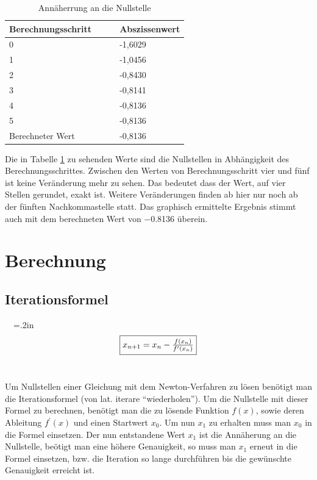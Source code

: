 \documentclass[a4paper,12pt,fleqn,oneside]{article}
\begin{document}
\FloatBarrier
		\begin{table}[]
			\centering
			\begin{tabular}{@{}ll@{}}
				\toprule
				Berechnungsschritt\ \ \ \ 		& Abszissenwert \\ \midrule
				0                  				& -1,6029       \\
				1                  				& -1,0456       \\
				2                  				& -0,8430       \\
				3                  				& -0,8141       \\
				4                  				& -0,8136       \\
				5                  				& -0,8136       \\
				Berechneter Wert   			& -0,8136       \\ \bottomrule
			\end{tabular}
			\caption{Annäherrung an die Nullstelle}
			\label{tab:nullstelle}
		\end{table}
		
\FloatBarrier
		
		\noindent
		Die in Tabelle \ref{tab:nullstelle} zu sehenden Werte sind die Nullstellen in Abhängigkeit des Berechnungsschrittes. Zwischen den Werten von
		Berechnungsschritt vier und fünf ist keine Veränderung mehr zu sehen. Das bedeutet dass der Wert, auf vier Stellen gerundet, exakt ist.
		Weitere Veränderungen finden ab hier nur noch ab der fünften Nachkommastelle statt. Das graphisch ermittelte Ergebnis stimmt auch mit dem
		berechneten Wert von \num{-0.8136} überein.

\newpage

\section{Berechnung}
	\subsection{Iterationsformel}
		\ \ 
		{\fboxsep=.2in $$\framebox{$x_{n+1} = x_{n} - \frac{f(x_{n})}{f^\prime(x_{n})}$}$$}\ \ 
		 
		Um Nullstellen einer Gleichung mit dem Newton-Verfahren zu lösen benötigt man die Iterationsformel (von lat. iterare "`wiederholen"').
		Um die Nullstelle mit dieser Formel zu berechnen, benötigt man die zu lösende Funktion $f(x)$, sowie deren Ableitung $f^\prime(x)$ und einen
		Startwert $x_0$. Um nun $x_1$ zu erhalten muss man $x_0$ in die Formel einsetzen. Der nun entstandene Wert $x_1$ ist die Annäherung an
		die Nullstelle, beötigt man eine höhere Genauigkeit, so muss man $x_1$ erneut in die Formel einsetzen, bzw. die Iteration so lange durchführen
		bis die gewünschte Genauigkeit erreicht ist.
\end{document}
